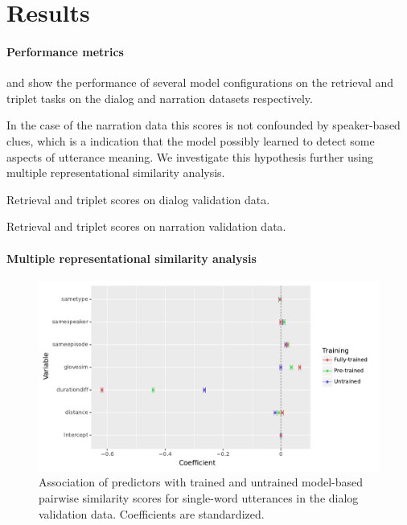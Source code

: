 \section{Results}
\label{sec:results}
\paragraph{Performance metrics}
 and  show
the performance of several model configurations on the retrieval and
triplet tasks on the dialog and narration datasets respectively.

In the case of the narration data this scores is not confounded by
speaker-based clues, which is a indication that the model possibly
learned to detect some aspects of utterance meaning. We investigate
this hypothesis further using multiple representational similarity
analysis.
 

 \begin{table}
   \centering
   
   \caption{Retrieval and triplet scores on dialog validation data.}
   \label{tab:scores-dialog}
 \end{table}

\begin{table}
   \centering
   
   \caption{Retrieval and triplet scores on narration validation data.}
   \label{tab:scores-narration}
 \end{table}
 
 
\paragraph{Multiple representational similarity analysis}

\begin{figure}
  \centering
  \includegraphics[scale=0.66]{results/grsa_dialog_coef.pdf}
  \caption{Association of predictors with trained and untrained
    model-based pairwise similarity scores for single-word utterances
    in the dialog validation data. Coefficients are standardized.}
  \label{fig:coef_dialog}
\end{figure}


